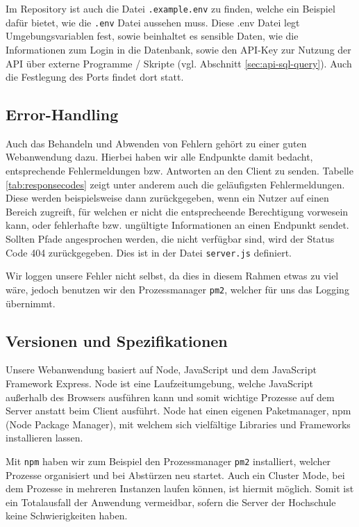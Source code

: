 Im Repository ist auch die Datei \verb|.example.env| zu finden, welche ein Beispiel dafür bietet, wie die \verb|.env| Datei aussehen muss. Diese .env Datei legt Umgebungsvariablen fest, sowie beinhaltet es sensible Daten, wie die Informationen zum Login in die Datenbank, sowie den API-Key zur Nutzung der API über externe Programme / Skripte (vgl. Abschnitt \ref{sec:api-sql-query}). Auch die Festlegung des Ports findet dort statt.\\


\subsection{Error-Handling}
\label{sec:nodechapter-error-handling}
Auch das Behandeln und Abwenden von Fehlern gehört zu einer guten Webanwendung dazu. Hierbei haben wir alle Endpunkte damit bedacht, entsprechende Fehlermeldungen bzw. Antworten an den Client zu senden. Tabelle \ref{tab:responsecodes} zeigt unter anderem auch die geläufigsten Fehlermeldungen. Diese werden beispielsweise dann zurückgegeben, wenn ein Nutzer auf einen Bereich zugreift, für welchen er nicht die entsprecheende Berechtigung vorwesein kann, oder fehlerhafte bzw. ungültigte Informationen an einen Endpunkt sendet. Sollten Pfade angesprochen werden, die nicht verfügbar sind, wird der Status Code 404 zurückgegeben. Dies ist in der Datei \verb|server.js| definiert.

Wir loggen unsere Fehler nicht selbst, da dies in diesem Rahmen etwas zu viel wäre, jedoch benutzen wir den Prozessmanager \verb|pm2|, welcher für uns das Logging übernimmt.\\


\subsection{Versionen und Spezifikationen}
\label{sec:nodechapter-versions}
Unsere Webanwendung basiert auf Node, JavaScript und dem JavaScript Framework Express. Node ist eine Laufzeitumgebung, welche JavaScript außerhalb des Browsers ausführen kann und somit wichtige Prozesse auf dem Server anstatt beim Client ausführt. Node hat einen eigenen Paketmanager, npm (Node Package Manager), mit welchem sich vielfältige Libraries und Frameworks installieren lassen.

Mit \verb|npm| haben wir zum Beispiel den Prozessmanager \verb|pm2| installiert, welcher Prozesse organisiert und bei Abstürzen neu startet. Auch ein Cluster Mode, bei dem Prozesse in mehreren Instanzen laufen können, ist hiermit möglich. Somit ist ein Totalausfall der Anwendung vermeidbar, sofern die Server der Hochschule keine Schwierigkeiten haben.

